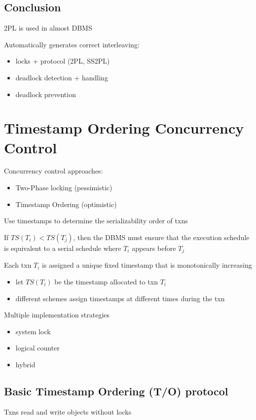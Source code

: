 \documentclass[11pt]{article}
\begin{document}
\subsection{Conclusion}
\label{sec:orgf983b6d}
2PL is used in almost DBMS

Automatically generates correct interleaving:
\begin{itemize}
\item locks + protocol (2PL, SS2PL)
\item deadlock detection + handling
\item deadlock prevention
\end{itemize}

\section{Timestamp Ordering Concurrency Control}
\label{sec:orgc244564}
Concurrency control approaches:
\begin{itemize}
\item Two-Phase locking (pessimistic)
\item Timestamp Ordering (optimistic)
\end{itemize}

Use timestamps to determine the serializability order of txns

If \(TS(T_i)<TS(T_j)\), then the DBMS must ensure that the execution schedule is equivalent to a
serial schedule where \(T_i\) appears before \(T_j\)

Each txn \(T_i\) is assigned a unique fixed timestamp that is monotonically increasing
\begin{itemize}
\item let \(TS(T_i)\) be the timestamp allocated to txn \(T_i\)
\item different schemes assign timestamps at different times during the txn
\end{itemize}

Multiple implementation strategies
\begin{itemize}
\item system lock
\item logical counter
\item hybrid
\end{itemize}
\subsection{Basic Timestamp Ordering (T/O) protocol}
\label{sec:orgcd282a3}
Txns read and write objects without locks
\end{document}
